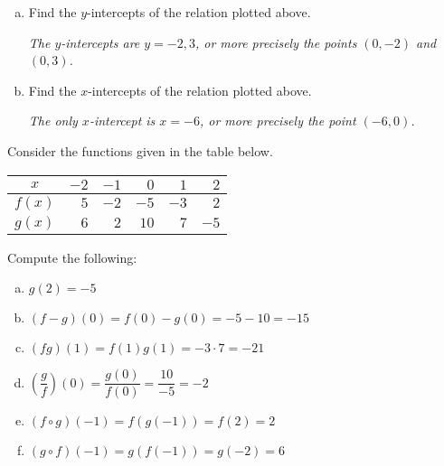 \documentclass[12pt,letterpaper]{exam}
\begin{document}
\begin{questions}
\begin{enumerate}[(a)]
{\itshape Yes, the relation $f(x)$ has an inverse function because it passes the horizontal line test, i.e. every horizontal line intersects the curve at most once.} \pvspace{0.2cm}

\item Find the $y$-intercepts of the relation plotted above. \pvspace{0.5cm}

{\itshape The $y$-intercepts are $y= -2, 3$, or more precisely the points $(0, -2)$ and $(0, 3)$.} \pvspace{0.5cm}

\item Find the $x$-intercepts of the relation plotted above. \pvspace{0.5cm}

{\itshape The only $x$-intercept is $x= -6$, or more precisely the point $(-6, 0)$.}
\end{enumerate}



\newpage



\question[6] Consider the functions given in the table below.
        \begin{table}[!ht]
        \centering
        \begin{tabular}{| c || r | r | r | r | r |} \hline
	$x$ & $-2$ & $-1$ & $0$ & $1$ & $2$ \\ \hline
	$f(x)$ & $5$ & $-2$ & $-5$ & $-3$ & $2$ \\ \hline
	$g(x)$ & $6$ & $2$ & $10$ & $7$ & $-5$ \\ \hline
        \end{tabular}
        \end{table}

Compute the following: \pspace
        \begin{enumerate}[(a)]
        \item $g(2)= -5$ \vfill
        \item $(f - g)(0)= f(0) - g(0)= -5 - 10= -15$ \vfill
        \item $(fg)(1)= f(1) g(1)= -3 \cdot 7= -21$ \vfill
        \item $\left( \dfrac{g}{f} \right)(0)= \dfrac{g(0)}{f(0)}= \dfrac{10}{-5}= -2$ \vfill
        \item $(f \circ g)(-1)= f(g(-1))= f(2)= 2$ \vfill
        \item $(g \circ f)(-1)= g(f(-1))= g(-2)= 6$ \vfill
        \end{enumerate}



\newpage




\end{questions}
\end{document}
